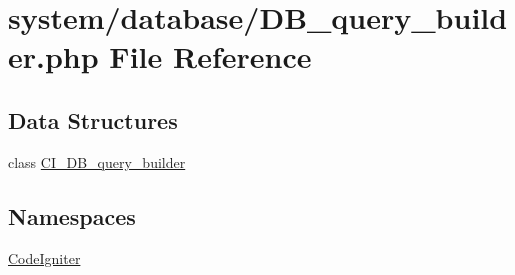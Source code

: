 \hypertarget{_d_b__query__builder_8php}{}\section{system/database/\+D\+B\+\_\+query\+\_\+builder.php File Reference}
\label{_d_b__query__builder_8php}
\subsection*{Data Structures}
\begin{DoxyCompactItemize}
\item 
class \mbox{\hyperlink{class_c_i___d_b__query__builder}{C\+I\+\_\+\+D\+B\+\_\+query\+\_\+builder}}
\end{DoxyCompactItemize}
\subsection*{Namespaces}
\begin{DoxyCompactItemize}
\item 
 \mbox{\hyperlink{namespace_code_igniter}{Code\+Igniter}}
\end{DoxyCompactItemize}
